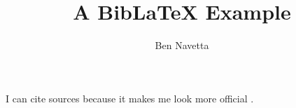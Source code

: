 \documentclass{article}
\title{A Bib\LaTeX{} Example}
\author{Ben Navetta}
\begin{document}
\maketitle

I can cite sources because it makes me look more official \cite{mysource}.

\printbibliography
\end{document}
